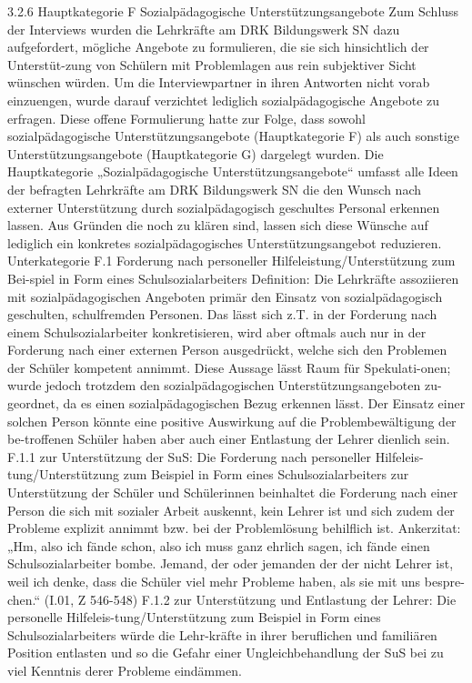 3.2.6 Hauptkategorie F Sozialpädagogische Unterstützungsangebote
Zum Schluss der Interviews wurden die Lehrkräfte am DRK Bildungswerk SN dazu aufgefordert, mögliche Angebote zu formulieren, die sie sich hinsichtlich der Unterstüt-zung von Schülern mit Problemlagen aus rein subjektiver Sicht wünschen würden. Um die Interviewpartner in ihren Antworten nicht vorab einzuengen, wurde darauf verzichtet lediglich sozialpädagogische Angebote zu erfragen. Diese offene Formulierung hatte zur Folge, dass sowohl sozialpädagogische Unterstützungsangebote (Hauptkategorie F) als auch sonstige Unterstützungsangebote (Hauptkategorie G) dargelegt wurden. 
Die Hauptkategorie „Sozialpädagogische Unterstützungsangebote“ umfasst alle Ideen der befragten Lehrkräfte am DRK Bildungswerk SN die den Wunsch nach externer Unterstützung durch sozialpädagogisch geschultes Personal erkennen lassen. Aus Gründen die noch zu klären sind, lassen sich diese Wünsche auf lediglich ein konkretes sozialpädagogisches Unterstützungsangebot reduzieren.
Unterkategorie F.1 Forderung nach personeller Hilfeleistung/Unterstützung zum Bei-spiel in Form eines Schulsozialarbeiters
Definition: Die Lehrkräfte assoziieren mit sozialpädagogischen Angeboten primär den Einsatz von sozialpädagogisch geschulten, schulfremden Personen. Das lässt sich z.T. in der Forderung nach einem Schulsozialarbeiter konkretisieren, wird aber oftmals auch nur in der Forderung nach einer externen Person ausgedrückt, welche sich den Problemen der Schüler kompetent annimmt. Diese Aussage lässt Raum für Spekulati-onen; wurde jedoch trotzdem den sozialpädagogischen Unterstützungsangeboten zu-geordnet, da es einen sozialpädagogischen Bezug erkennen lässt. Der Einsatz einer solchen Person könnte eine positive Auswirkung auf die Problembewältigung der be-troffenen Schüler haben aber auch einer Entlastung der Lehrer dienlich sein.
F.1.1 zur Unterstützung der SuS: Die Forderung nach personeller Hilfeleis-tung/Unterstützung zum Beispiel in Form eines Schulsozialarbeiters zur Unterstützung der Schüler und Schülerinnen beinhaltet die Forderung nach einer Person die sich mit sozialer Arbeit auskennt, kein Lehrer ist und sich zudem der Probleme explizit annimmt bzw. bei der Problemlösung behilflich ist.
Ankerzitat: „Hm, also ich fände schon, also ich muss ganz ehrlich sagen, ich fände einen Schulsozialarbeiter bombe. Jemand, der oder jemanden der der nicht Lehrer ist, weil ich denke, dass die Schüler viel mehr Probleme haben, als sie mit uns bespre-chen.“ (I.01, Z  546-548)
F.1.2 zur Unterstützung und Entlastung der Lehrer: Die personelle Hilfeleis-tung/Unterstützung zum Beispiel in Form eines Schulsozialarbeiters würde die Lehr-kräfte in ihrer beruflichen und familiären Position entlasten und so die Gefahr einer Ungleichbehandlung der SuS bei zu viel Kenntnis derer Probleme eindämmen.
